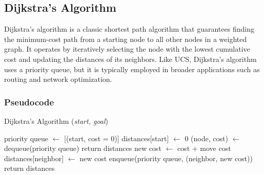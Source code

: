 \subsection{Dijkstra's Algorithm}
\noindent Dijkstra's algorithm is a classic shortest path algorithm that guarantees finding the minimum-cost path from a starting node to all other nodes in a weighted graph. It operates by iteratively selecting the node with the lowest cumulative cost and updating the distances of its neighbors. Like UCS, Dijkstra's algorithm uses a priority queue, but it is typically employed in broader applications such as routing and network optimization.

\subsubsection{Pseudocode}
\begin{algorithm}[H]
	\caption{Dijkstra's Algorithm (\textit{start, goal})}
	\label{alg:dijkstra}
	\begin{algorithmic}[1]
		\State priority queue \(\gets\) [(start, cost = 0)]
		\State distances[start] \(\gets\) 0
		\State (node, cost) \(\gets\) dequeue(priority queue)
		\State return distances
		\EndIf
		\State new cost \(\gets\) cost + move cost
		\State distances[neighbor] \(\gets\) new cost
		\State enqueue(priority queue, (neighbor, new cost))
		\EndIf
		\EndFor
		\EndWhile
		\State return distances
	\end{algorithmic}
\end{algorithm}


